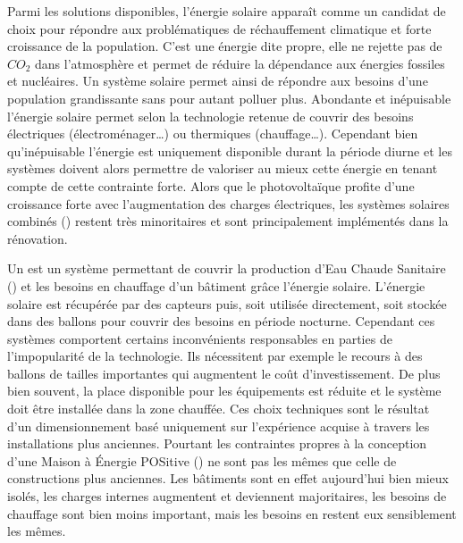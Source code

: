 Parmi les solutions disponibles, l’énergie solaire apparaît comme un candidat de choix
pour répondre aux problématiques de réchauffement climatique et forte croissance de la
population. C’est une énergie dite propre, elle ne rejette pas de $CO_{2}$ dans
l’atmosphère et permet de réduire la dépendance aux énergies fossiles et nucléaires. Un
système solaire permet ainsi de répondre aux besoins d’une population grandissante sans
pour autant polluer plus. Abondante et inépuisable l’énergie solaire permet selon la
technologie retenue de couvrir des besoins électriques (électroménager\dots) ou thermiques
(chauffage\dots). Cependant bien qu’inépuisable l’énergie est uniquement disponible durant
la période diurne et les systèmes doivent alors permettre de valoriser au mieux cette
énergie en tenant compte de cette contrainte forte. Alors que le photovoltaïque profite
d’une croissance forte avec l’augmentation des charges électriques, les systèmes solaires
combinés () restent très minoritaires et sont principalement implémentés dans la
rénovation.

Un  est un système permettant de couvrir la production d’Eau Chaude Sanitaire
() et les besoins en chauffage d’un bâtiment grâce l’énergie solaire. L’énergie
solaire est récupérée par des capteurs puis, soit utilisée directement, soit stockée dans
des ballons pour couvrir des besoins en période nocturne. Cependant ces systèmes
comportent certains inconvénients responsables en parties de l’impopularité de la
technologie. Ils nécessitent par exemple le recours à des ballons de tailles importantes
qui augmentent le coût d’investissement. De plus bien souvent, la place disponible pour
les équipements est réduite et le système doit être installée dans la zone chauffée. Ces
choix techniques sont le résultat d’un dimensionnement basé uniquement sur l’expérience
acquise à travers les installations plus anciennes. Pourtant les contraintes propres à la
conception d’une Maison à Énergie POSitive () ne sont pas les mêmes que celle
de constructions plus anciennes. Les bâtiments sont en effet aujourd’hui bien mieux
isolés, les charges internes augmentent et deviennent majoritaires, les besoins de
chauffage sont bien moins important, mais les besoins en  restent eux
sensiblement les mêmes.

